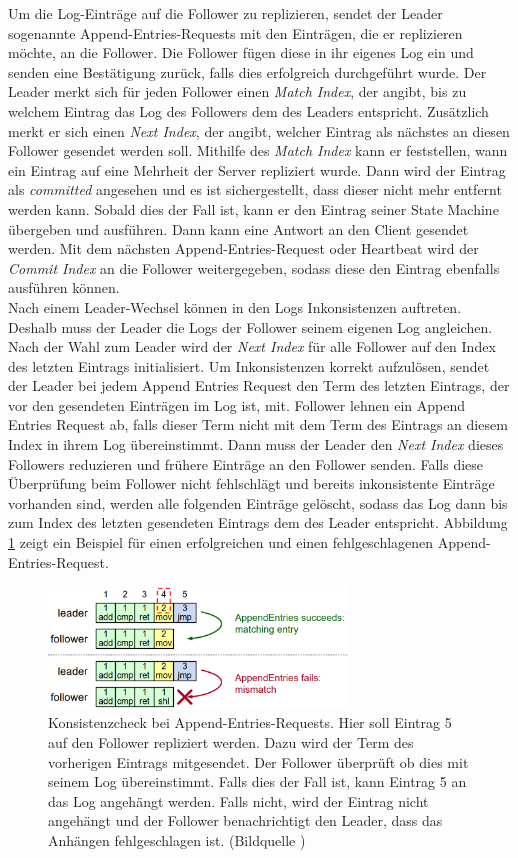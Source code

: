 Um die Log-Einträge auf die Follower zu replizieren, sendet der Leader sogenannte Append-Entries-Requests mit den Einträgen, die er replizieren möchte, an die Follower. Die Follower fügen diese in ihr eigenes Log ein und senden eine Bestätigung zurück, falls dies erfolgreich durchgeführt wurde. Der Leader merkt sich für jeden Follower einen \textit{Match Index}, der angibt, bis zu welchem Eintrag das Log des Followers dem des Leaders entspricht. Zusätzlich merkt er sich einen \textit{Next Index}, der angibt, welcher Eintrag als nächstes an diesen Follower gesendet werden soll. Mithilfe des \textit{Match Index} kann er feststellen, wann ein Eintrag auf eine Mehrheit der Server repliziert wurde. Dann wird der Eintrag als \textit{committed} angesehen und es ist sichergestellt, dass dieser nicht mehr entfernt werden kann. Sobald dies der Fall ist, kann er den Eintrag seiner State Machine übergeben und ausführen. Dann kann eine Antwort an den Client gesendet werden. Mit dem nächsten Append-Entries-Request oder Heartbeat wird der \textit{Commit Index} an die Follower weitergegeben, sodass diese den Eintrag ebenfalls ausführen können. \\
Nach einem Leader-Wechsel können in den Logs Inkonsistenzen auftreten. Deshalb muss der Leader die Logs der Follower seinem eigenen Log angleichen. Nach der Wahl zum Leader wird der \textit{Next Index} für alle Follower auf den Index des letzten Eintrags initialisiert. Um Inkonsistenzen korrekt aufzulösen, sendet der Leader bei jedem Append Entries Request den Term des letzten Eintrags, der vor den gesendeten Einträgen im Log ist, mit. Follower lehnen ein Append Entries Request ab, falls dieser Term nicht mit dem Term des Eintrags an diesem Index in ihrem Log übereinstimmt. Dann muss der Leader den \textit{Next Index} dieses Followers reduzieren und frühere Einträge an den Follower senden. Falls diese Überprüfung beim Follower nicht fehlschlägt und bereits inkonsistente Einträge vorhanden sind, werden alle folgenden Einträge gelöscht, sodass das Log dann bis zum Index des letzten gesendeten Eintrags dem des Leader entspricht. Abbildung \ref{fig:log-consistency} zeigt ein Beispiel für einen erfolgreichen und einen fehlgeschlagenen Append-Entries-Request.

\begin{figure}[H]
	\centering
	\includegraphics[width=300px]{img/log-consistency.png}
	\caption{Konsistenzcheck bei Append-Entries-Requests. Hier soll Eintrag 5 auf den Follower repliziert werden. Dazu wird der Term des vorherigen Eintrags mitgesendet. Der Follower überprüft ob dies mit seinem Log übereinstimmt. Falls dies der Fall ist, kann Eintrag 5 an das Log angehängt werden. Falls nicht, wird der Eintrag nicht angehängt und der Follower benachrichtigt den Leader, dass das Anhängen fehlgeschlagen ist. (Bildquelle \cite{raft-user-study})}
	\label{fig:log-consistency}
\end{figure}


